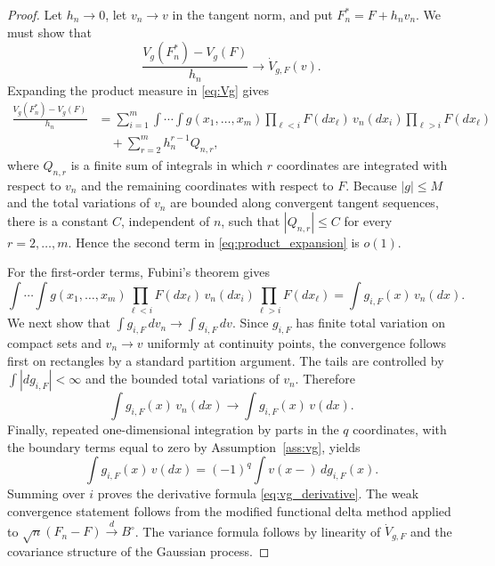 \documentclass[11pt]{article}
\theoremstyle{definition}
\newcommand{\dto}{\xrightarrow{d}}
\begin{document}
\begin{proof}
Let \(h_n\to0\), let \(v_n\to v\) in the tangent norm, and put \(F_n^*=F+h_nv_n\).  We must show that
\[
\frac{V_g(F_n^*)-V_g(F)}{h_n}\to \dot V_{g,F}(v).
\]
Expanding the product measure in \eqref{eq:Vg} gives
\begin{align}\label{eq:product_expansion}
\frac{V_g(F_n^*)-V_g(F)}{h_n}
&=\sum_{i=1}^m
\int\cdots\int g(x_1,\ldots,x_m)
\prod_{\ell<i}F(dx_\ell)\,v_n(dx_i)\prod_{\ell>i}F(dx_\ell) \\
&\quad +\sum_{r=2}^m h_n^{r-1} Q_{n,r},\nonumber
\end{align}
where \(Q_{n,r}\) is a finite sum of integrals in which \(r\) coordinates are integrated with respect to \(v_n\) and the remaining coordinates with respect to \(F\).  Because \(|g|\le M\) and the total variations of \(v_n\) are bounded along convergent tangent sequences, there is a constant \(C\), independent of \(n\), such that \(|Q_{n,r}|\le C\) for every \(r=2,\ldots,m\).  Hence the second term in \eqref{eq:product_expansion} is \(o(1)\).

For the first-order terms, Fubini's theorem gives
\[
\int\cdots\int g(x_1,\ldots,x_m)
\prod_{\ell<i}F(dx_\ell)\,v_n(dx_i)\prod_{\ell>i}F(dx_\ell)
=\int g_{i,F}(x)\,v_n(dx).
\]
We next show that \(\int g_{i,F}\,dv_n\to \int g_{i,F}\,dv\).  Since \(g_{i,F}\) has finite total variation on compact sets and \(v_n\to v\) uniformly at continuity points, the convergence follows first on rectangles by a standard partition argument.  The tails are controlled by \(\int|dg_{i,F}|<\infty\) and the bounded total variations of \(v_n\).  Therefore
\[
\int g_{i,F}(x)\,v_n(dx)\to \int g_{i,F}(x)\,v(dx).
\]
Finally, repeated one-dimensional integration by parts in the \(q\) coordinates, with the boundary terms equal to zero by Assumption~\ref{ass:vg}, yields
\[
\int g_{i,F}(x)\,v(dx)=(-1)^q\int v(x-)\,dg_{i,F}(x).
\]
Summing over \(i\) proves the derivative formula \eqref{eq:vg_derivative}.  The weak convergence statement follows from the modified functional delta method applied to \(\sqrt n(F_n-F)\dto B^\circ\).  The variance formula follows by linearity of \(\dot V_{g,F}\) and the covariance structure of the Gaussian process.
\end{proof}
\end{document}
